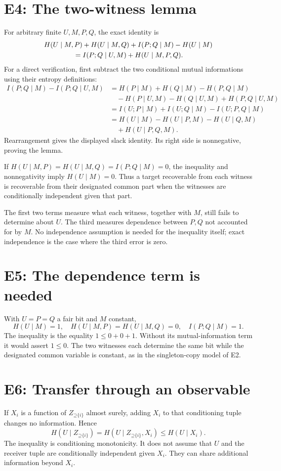 \documentclass[11pt]{article}
\newcommand{\Up}{\mathord{\supseteq}}
\begin{document}
\section{E4: The two-witness lemma}
\label{sec:e4}
For arbitrary finite $U,M,P,Q$, the exact identity is
\begin{align*}
 &H(U\mid M,P)+H(U\mid M,Q)+I(P;Q\mid M)-H(U\mid M)\\
 &\hspace{15mm}=I(P;Q\mid U,M)+H(U\mid M,P,Q).
\end{align*}
For a direct verification, first subtract the two conditional mutual
informations using their entropy definitions:
\begin{align*}
 I(P;Q\mid M)-I(P;Q\mid U,M)
 &=H(P\mid M)+H(Q\mid M)-H(P,Q\mid M)\\
 &\quad-H(P\mid U,M)-H(Q\mid U,M)+H(P,Q\mid U,M)\\
 &=I(U;P\mid M)+I(U;Q\mid M)-I(U;P,Q\mid M)\\
 &=H(U\mid M)-H(U\mid P,M)-H(U\mid Q,M)\\
 &\quad+H(U\mid P,Q,M).
\end{align*}
Rearrangement gives the displayed slack identity. Its right side is
nonnegative, proving the lemma.

If $H(U\mid M,P)=H(U\mid M,Q)=I(P;Q\mid M)=0$, the inequality and
nonnegativity imply $H(U\mid M)=0$. Thus a target recoverable from each
witness is recoverable from their designated common part when the witnesses
are conditionally independent given that part.

The first two terms measure what each witness, together with $M$, still fails
to determine about $U$. The third measures dependence between $P,Q$ not
accounted for by $M$. No independence assumption is needed for the inequality
itself; exact independence is the case where the third error is zero.

\section{E5: The dependence term is needed}
\label{sec:e5}
With $U=P=Q$ a fair bit and $M$ constant,
\[
 H(U\mid M)=1,\quad H(U\mid M,P)=H(U\mid M,Q)=0,
 \quad I(P;Q\mid M)=1.
\]
The inequality is the equality $1\le0+0+1$. Without its mutual-information
term it would assert $1\le0$. The two witnesses each determine the same bit while
the designated common variable is constant, as in the singleton-copy model
of E2.

\section{E6: Transfer through an observable}
\label{sec:e6}
If $X_i$ is a function of $Z_{\Up\{i\}}$ almost surely, adding $X_i$ to
that conditioning tuple changes no information. Hence
\[
 H(U\mid Z_{\Up\{i\}})
 =H(U\mid Z_{\Up\{i\}},X_i)
 \le H(U\mid X_i).
\]
The inequality is conditioning monotonicity. It does not assume that $U$ and
the receiver tuple are conditionally independent given $X_i$. They can share
additional information beyond $X_i$.
\end{document}
